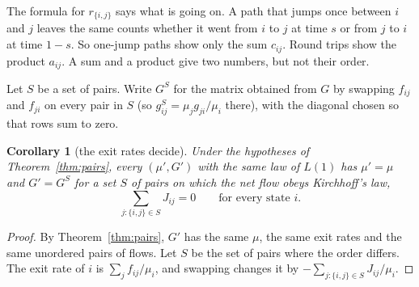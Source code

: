 \documentclass[11pt]{article}
\newtheorem{corollary}[theorem]{Corollary}
\theoremstyle{definition}
\theoremstyle{remark}
\begin{document}
The formula for $r_{\{i,j\}}$ says what is going on. A path that jumps once
between $i$ and $j$ leaves the same counts whether it went from $i$ to $j$ at
time $s$ or from $j$ to $i$ at time $1-s$. So one-jump paths show only the sum
$c_{ij}$. Round trips show the product $a_{ij}$. A sum and a product give two
numbers, but not their order.

Let $S$ be a set of pairs. Write $G^S$ for the matrix obtained from $G$ by
swapping $f_{ij}$ and $f_{ji}$ on every pair in $S$ (so
$g^S_{ij}=\mu_jg_{ji}/\mu_i$ there), with the diagonal chosen so that rows sum
to zero.

\begin{corollary}[the exit rates decide]\label{cor:candidates}
Under the hypotheses of Theorem~\ref{thm:pairs}, every $(\mu',G')$ with the same
law of $L(1)$ has $\mu'=\mu$ and $G'=G^S$ for a set $S$ of pairs on which the
net flow obeys Kirchhoff's law,
\begin{equation}\label{eq:kirchhoff}
\sum_{j:\{i,j\}\in S}J_{ij}=0\qquad\text{for every state }i .
\end{equation}
\end{corollary}
\begin{proof}
By Theorem~\ref{thm:pairs}, $G'$ has the same $\mu$, the same exit rates and the
same unordered pairs of flows. Let $S$ be the set of pairs where the order
differs. The exit rate of $i$ is $\sum_jf_{ij}/\mu_i$, and swapping changes it by
$-\sum_{j:\{i,j\}\in S}J_{ij}/\mu_i$.
\end{proof}
\end{document}
